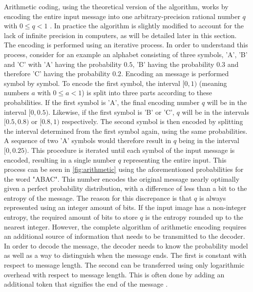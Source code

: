 Arithmetic coding, using the theoretical version of the algorithm, works by encoding the entire input message into one arbitrary-precision rational number $q$ with $0 \leq q < 1$ \citep{said_introduction_2023}. In practice the algorithm is slightly modified to account for the lack of infinite precision in computers, as will be detailed later in this section. The encoding is performed using an iterative process. In order to understand this process, consider for an example an alphabet consisting of three symbols, 'A', 'B' and 'C' with 'A' having the probability $0.5$, 'B' having the probability $0.3$ and therefore 'C' having the probability $0.2$. Encoding an message is performed symbol by symbol. To encode the first symbol, the interval $[0,1)$ (meaning numbers $a$ with $0 \leq a < 1$) is split into three parts according to these probabilities. If the first symbol is 'A', the final encoding number $q$ will be in the interval $[0,0.5)$. Likewise, if the first symbol is 'B' or 'C', $q$ will be in the intervals $[0.5,0.8)$ or $[0.8,1)$ respectively. The second symbol is then encoded by splitting the interval determined from the first symbol again, using the same probabilities. A sequence of two 'A' symbols would therefore result in $q$ being in the interval $[0,0.25)$. This procedure is iterated until each symbol of the input message is encoded, resulting in a single number $q$ representing the entire input. This process can be seen in \autoref{fig:arithmetic} using the aforementioned probabilities for the word "ABAC". This number encodes the original message nearly optimally given a perfect probability distribution, with a difference of less than a bit to the entropy of the message. The reason for this discrepance is that $q$ is always represented using an integer amount of bits. If the input image has a non-integer entropy, the required amount of bits to store $q$ is the entropy rounded up to the nearest integer. However, the complete algorithm of arithmetic encoding requires an additional source of information that needs to be transmitted to the decoder. In order to decode the message, the decoder needs to know the probability model as well as a way to distinguish when the message ends. The first is constant with respect to message length. The second can be transferred using only logarithmic overhead with respect to message length. This is often done by adding an additional token that signifies the end of the message \citep{said_introduction_2023}.

